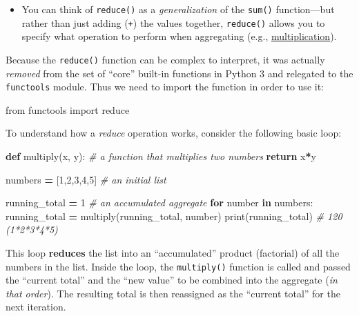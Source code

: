 \documentclass[]{book}
\newenvironment{Shaded}{\begin{snugshade}}{\end{snugshade}}
\newcommand{\KeywordTok}[1]{\textcolor[rgb]{0.13,0.29,0.53}{\textbf{#1}}}
\newcommand{\DecValTok}[1]{\textcolor[rgb]{0.00,0.00,0.81}{#1}}
\newcommand{\ImportTok}[1]{#1}
\newcommand{\CommentTok}[1]{\textcolor[rgb]{0.56,0.35,0.01}{\textit{#1}}}
\newcommand{\ControlFlowTok}[1]{\textcolor[rgb]{0.13,0.29,0.53}{\textbf{#1}}}
\newcommand{\OperatorTok}[1]{\textcolor[rgb]{0.81,0.36,0.00}{\textbf{#1}}}
\newcommand{\BuiltInTok}[1]{#1}
\newcommand{\NormalTok}[1]{#1}
\providecommand{\tightlist}{%
  \setlength{\itemsep}{0pt}\setlength{\parskip}{0pt}}
\begin{document}
\begin{itemize}
\tightlist
\item
  You can think of \texttt{reduce()} as a \emph{generalization} of the
  \texttt{sum()} function---but rather than just adding (\texttt{+}) the
  values together, \texttt{reduce()} allows you to specify what
  operation to perform when aggregating (e.g.,
  \href{https://en.wikipedia.org/wiki/Factorial}{multiplication}).
\end{itemize}

Because the \texttt{reduce()} function can be complex to interpret, it
was actually \emph{removed} from the set of ``core'' built-in functions
in Python 3 and relegated to the \texttt{functools} module. Thus we need
to import the function in order to use it:

\begin{Shaded}
\begin{Highlighting}[]
\ImportTok{from}\NormalTok{ functools }\ImportTok{import} \BuiltInTok{reduce}
\end{Highlighting}
\end{Shaded}

To understand how a \emph{reduce} operation works, consider the
following basic loop:

\begin{Shaded}
\begin{Highlighting}[]
\KeywordTok{def}\NormalTok{ multiply(x, y): }\CommentTok{# a function that multiplies two numbers}
    \ControlFlowTok{return}\NormalTok{ x}\OperatorTok{*}\NormalTok{y}

\NormalTok{numbers }\OperatorTok{=}\NormalTok{ [}\DecValTok{1}\NormalTok{,}\DecValTok{2}\NormalTok{,}\DecValTok{3}\NormalTok{,}\DecValTok{4}\NormalTok{,}\DecValTok{5}\NormalTok{]  }\CommentTok{# an initial list}

\NormalTok{running_total }\OperatorTok{=} \DecValTok{1}  \CommentTok{# an accumulated aggregate}
\ControlFlowTok{for}\NormalTok{ number }\KeywordTok{in}\NormalTok{ numbers:}
\NormalTok{    running_total }\OperatorTok{=}\NormalTok{ multiply(running_total, number)}
\BuiltInTok{print}\NormalTok{(running_total)  }\CommentTok{# 120  (1*2*3*4*5)}
\end{Highlighting}
\end{Shaded}

This loop \textbf{reduces} the list into an ``accumulated'' product
(factorial) of all the numbers in the list. Inside the loop, the
\texttt{multiply()} function is called and passed the ``current total''
and the ``new value'' to be combined into the aggregate (\emph{in that
order}). The resulting total is then reassigned as the ``current total''
for the next iteration.
\end{document}
